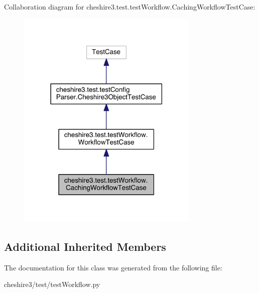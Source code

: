 Collaboration diagram for cheshire3.\-test.\-test\-Workflow.\-Caching\-Workflow\-Test\-Case\-:
\nopagebreak
\begin{figure}[H]
\begin{center}
\leavevmode
\includegraphics[width=246pt]{classcheshire3_1_1test_1_1test_workflow_1_1_caching_workflow_test_case__coll__graph}
\end{center}
\end{figure}
\subsection*{Additional Inherited Members}


The documentation for this class was generated from the following file\-:\begin{DoxyCompactItemize}
\item 
cheshire3/test/test\-Workflow.\-py\end{DoxyCompactItemize}
